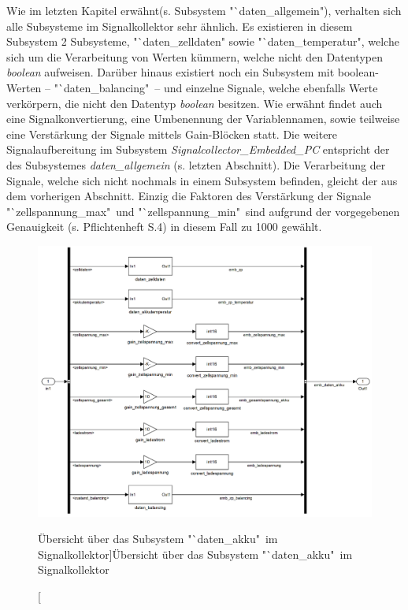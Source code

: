 \documentclass[fontsize = 12pt, paper = a4]{scrreprt}
\begin{document}
Wie im letzten Kapitel erwähnt(s. Subsystem "`daten\_allgemein"), verhalten sich alle Subsysteme im Signalkollektor sehr ähnlich. Es existieren in diesem Subsystem 2 Subsysteme, "`daten\_zelldaten" sowie "`daten\_temperatur", welche sich um die Verarbeitung von Werten kümmern, welche nicht den Datentypen \textit{boolean} aufweisen. Darüber hinaus existiert noch ein Subsystem mit boolean-Werten -- "`daten\_balancing"\ -- und einzelne Signale, welche ebenfalls Werte verkörpern, die nicht den Datentyp \textit{boolean} besitzen. Wie erwähnt findet auch eine Signalkonvertierung, eine Umbenennung der Variablennamen, sowie teilweise eine Verstärkung der Signale mittels Gain-Blöcken statt. Die weitere Signalaufbereitung im Subsystem \textit{Signalcollector\_Embedded\_PC} entspricht der des Subsystemes \textit{daten\_allgemein} (s. letzten Abschnitt). Die Verarbeitung der Signale, welche sich nicht nochmals in einem Subsystem befinden, gleicht der aus dem vorherigen Abschnitt. Einzig die Faktoren des Verstärkung der Signale "`zellspannung\_max"\ und "`zellspannung\_min"\ sind aufgrund der vorgegebenen Genauigkeit (s. Pflichtenheft S.4) in diesem Fall zu 1000 gewählt.

\newpage

\begin{figure}[h]
\centering
\includegraphics[scale = 0.45]{sc_daten_akku}
\caption[Übersicht über das Subsystem "`daten\_akku"\ im Signalkollektor]{Übersicht über das Subsystem "`daten\_akku"\ im Signalkollektor}
\label{scdatenakku}
\end{figure}
\end{document}
